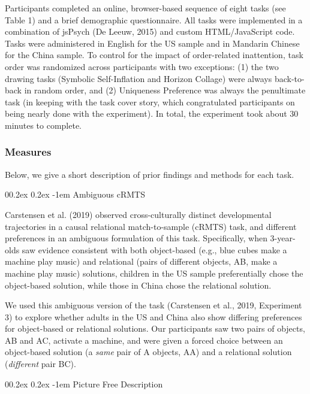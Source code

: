 \documentclass[
  man,floatsintext]{apa6}
\makeatletter
\let\oldparagraph\paragraph
\renewcommand{\paragraph}[1]{\oldparagraph{#1}\mbox{}}
\renewcommand{\paragraph}{\@startsection{paragraph}{4}{\parindent}%
  {0\baselineskip \@plus 0.2ex \@minus 0.2ex}%
  {-1em}%
  {\normalfont\normalsize\bfseries\itshape\typesectitle}}
\makeatother
\begin{document}
Participants completed an online, browser-based sequence of eight tasks (see Table 1) and a brief demographic questionnaire. All tasks were implemented in a combination of jsPsych (De Leeuw, 2015) and custom HTML/JavaScript code. Tasks were administered in English for the US sample and in Mandarin Chinese for the China sample. To control for the impact of order-related inattention, task order was randomized across participants with two exceptions: (1) the two drawing tasks (Symbolic Self-Inflation and Horizon Collage) were always back-to-back in random order, and (2) Uniqueness Preference was always the penultimate task (in keeping with the task cover story, which congratulated participants on being nearly done with the experiment). In total, the experiment took about 30 minutes to complete.

\hypertarget{measures}{%
\subsubsection{Measures}\label{measures}}

Below, we give a short description of prior findings and methods for each task.

\hypertarget{ambiguous-crmts}{%
\paragraph{Ambiguous cRMTS}\label{ambiguous-crmts}}

Carstensen et al. (2019) observed cross-culturally distinct developmental trajectories in a causal relational match-to-sample (cRMTS) task, and different preferences in an ambiguous formulation of this task. Specifically, when 3-year-olds saw evidence consistent with both object-based (e.g., blue cubes make a machine play music) and relational (pairs of different objects, AB, make a machine play music) solutions, children in the US sample preferentially chose the object-based solution, while those in China chose the relational solution.

We used this ambiguous version of the task (Carstensen et al., 2019, Experiment 3) to explore whether adults in the US and China also show differing preferences for object-based or relational solutions. Our participants saw two pairs of objects, AB and AC, activate a machine, and were given a forced choice between an object-based solution (a \emph{same} pair of A objects, AA) and a relational solution (\emph{different} pair BC).

\hypertarget{picture-free-description}{%
\paragraph{Picture Free Description}\label{picture-free-description}}
\end{document}
